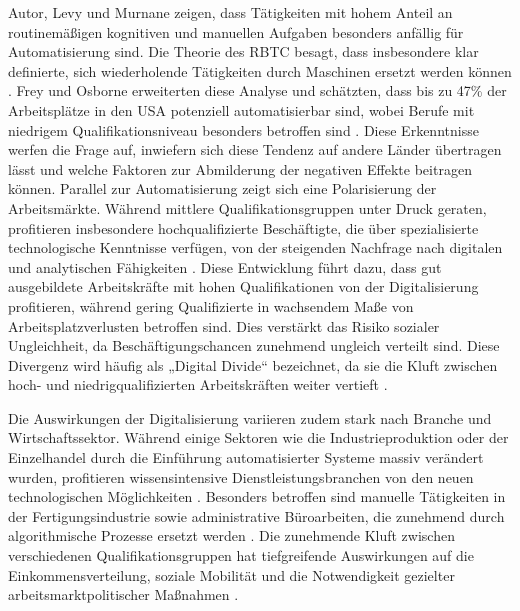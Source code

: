 Autor, Levy und Murnane zeigen, dass Tätigkeiten mit hohem Anteil an routinemäßigen kognitiven 
und manuellen Aufgaben besonders anfällig für Automatisierung sind. Die Theorie des \ac{RBTC} 
besagt, dass insbesondere klar definierte, sich wiederholende Tätigkeiten durch Maschinen ersetzt 
werden können \parencite[vgl.][S. 2509–2510]{goos2014explaining}. Frey und Osborne erweiterten 
diese Analyse und schätzten, dass bis zu 47\% der Arbeitsplätze in den USA potenziell 
automatisierbar sind, wobei Berufe mit niedrigem Qualifikationsniveau besonders betroffen sind 
\parencite[S. 39-41]{frey2013thefuture}. Diese Erkenntnisse  werfen die Frage auf, inwiefern sich 
diese Tendenz auf andere Länder übertragen lässt und welche Faktoren zur Abmilderung der 
negativen Effekte beitragen können. 
Parallel zur Automatisierung zeigt sich eine Polarisierung der Arbeitsmärkte. Während 
mittlere Qualifikationsgruppen unter Druck geraten, profitieren insbesondere 
hochqualifizierte Beschäftigte, die über spezialisierte technologische Kenntnisse 
verfügen, von der steigenden Nachfrage nach digitalen und analytischen Fähigkeiten 
\parencite[vgl.][S. 2509]{goos2014explaining}. Diese Entwicklung führt dazu, dass gut 
ausgebildete Arbeitskräfte mit hohen Qualifikationen von der Digitalisierung profitieren, 
während gering Qualifizierte in wachsendem Maße von Arbeitsplatzverlusten betroffen sind. 
Dies verstärkt das Risiko sozialer Ungleichheit, da Beschäftigungschancen zunehmend 
ungleich verteilt sind. Diese Divergenz wird häufig als „Digital Divide“ bezeichnet, da 
sie die Kluft zwischen hoch- und niedrigqualifizierten Arbeitskräften weiter vertieft 
\parencite[vgl.][S. 3]{oecd2019measuring}.

Die Auswirkungen der Digitalisierung variieren zudem stark nach Branche und
Wirtschaftssektor. Während einige Sektoren wie die Industrieproduktion oder der
Einzelhandel durch die Einführung automatisierter Systeme massiv verändert wurden,
profitieren wissensintensive Dienstleistungsbranchen von den neuen technologischen 
Möglichkeiten \parencite[vgl.][S. 1555]{autor2013thegrowth}. Besonders betroffen sind 
manuelle Tätigkeiten in der Fertigungsindustrie sowie administrative Büroarbeiten, die 
zunehmend durch algorithmische Prozesse ersetzt werden 
\parencite[vgl.][S. 36–38]{frey2013thefuture}. Die zunehmende Kluft zwischen verschiedenen 
Qualifikationsgruppen hat tiefgreifende Auswirkungen auf die Einkommensverteilung, soziale 
Mobilität und die Notwendigkeit gezielter arbeitsmarktpolitischer Maßnahmen 
\parencite[S. 1589–1591]{autor2013thegrowth}.

